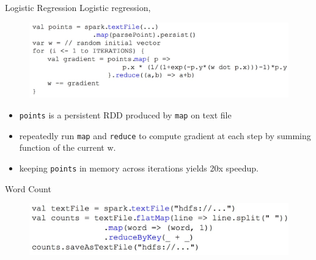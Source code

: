 \appendix

\begin{frame}[plain]
\end{frame}


\begin{frame}[plain]{Logistic Regression}
Logistic regression,
\begin{figure}
\centering
\includegraphics[width=0.9\linewidth]{figures/logistic-regression.jpg}
\end{figure}
\begin{itemize}
  \item \texttt{points} is a persistent RDD produced by \texttt{map} on text
  file
  \item repeatedly run \texttt{map} and \texttt{reduce} to compute gradient at
  each step by summing function of the current w.
  \item keeping \texttt{points} in memory across iterations yields 20x speedup.
\end{itemize}
\end{frame}

\begin{frame}[plain]{Word Count}
\begin{figure}
\centering
\includegraphics[width=0.9\linewidth]{figures/word-count.jpg}
\end{figure}
\end{frame}

